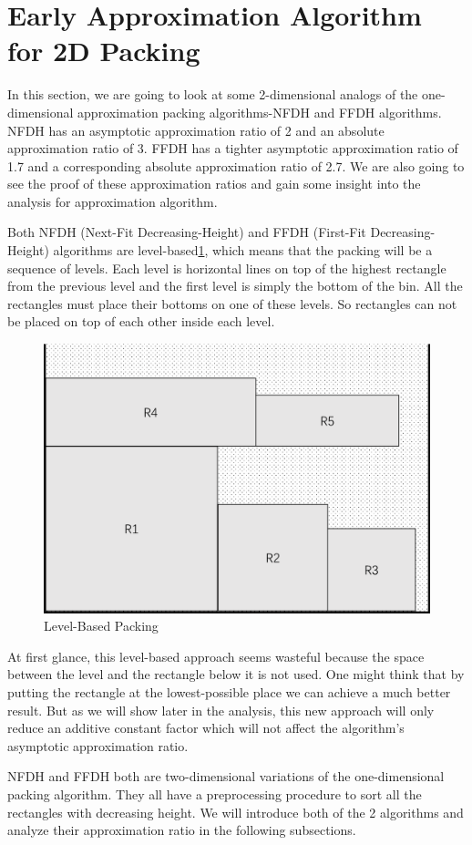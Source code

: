 \documentclass[sigplan,screen,nonacm]{acmart}\settopmatter{printfolios=true,printccs=false,printacmref=false}
\begin{document}
\section{Early Approximation Algorithm for 2D Packing}
In this section, we are going to look at some 2-dimensional analogs of the one-dimensional approximation packing algorithms\cite{johnson1974worst}-NFDH and FFDH algorithms. NFDH has an asymptotic approximation ratio of 2 and an absolute approximation ratio of 3. FFDH has a tighter asymptotic approximation ratio of 1.7 and a corresponding absolute approximation ratio of 2.7. We are also going to see the proof of these approximation ratios and gain some insight into the analysis for approximation algorithm.\par
Both NFDH (Next-Fit Decreasing-Height) and FFDH (First-Fit Decreasing-Height) algorithms are level-based\ref{fig:level-based}, which means that the packing will be a sequence of levels. Each level is horizontal lines on top of the highest rectangle from the previous level and the first level is simply the bottom of the bin. All the rectangles must place their bottoms on one of these levels. So rectangles can not be placed on top of each other inside each level.
\begin{figure}[htbp]
  \centering
  \includegraphics[scale=0.4]{levelbased}
  \caption{Level-Based Packing}
  \label{fig:level-based}
\end{figure}
At first glance, this level-based approach seems wasteful because the space between the level and the rectangle below it is not used. One might think that by putting the rectangle at the lowest-possible place we can achieve a much better result. But as we will show later in the analysis, this new approach will only reduce an additive constant factor which will not affect the algorithm's asymptotic approximation ratio.\par
NFDH and FFDH both are two-dimensional variations of the one-dimensional packing algorithm\cite{johnson1974worst}. They all have a preprocessing procedure to sort all the rectangles with decreasing height. We will introduce both of the 2 algorithms and analyze their approximation ratio in the following subsections.
\end{document}
